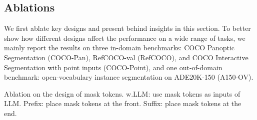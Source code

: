 \subsection{Ablations}
We first ablate key designs and present behind insights in this section. To better show how different designs affect the performance on a wide range of tasks, we mainly report the results on three in-domain benchmarks: COCO Panoptic Segmentation (COCO-Pan), RefCOCO-val (RefCOCO), and COCO Interactive Segmentation with point inputs (COCO-Point), and one out-of-domain benchmark: open-vocabulary instance segmentation on ADE20K-150 (A150-OV).
\begin{table}[h!]
  \begin{minipage}{.6\textwidth}
  \centering
\footnotesize
\caption{Ablation on the design of mask tokens. w.LLM: use mask tokens as inputs of LLM. Prefix: place mask tokens at the front. Suffix: place mask tokens at the end.}
\renewcommand{\arraystretch}{0.9}
\label{tab:mask_query}

  \end{minipage}\hfill
  \begin{minipage}{.35\textwidth}
  \centering
\captionsetup{font=small}
\footnotesize
\caption{Effect of decouple design in COCO Semantic Segmentation. }

  \end{minipage}
\end{table}

